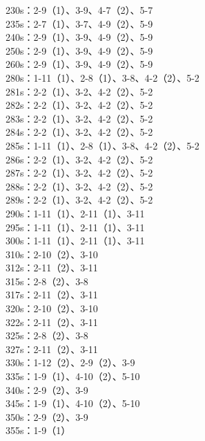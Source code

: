 \documentclass[a4paper,12pt]{article}
\begin{document}
		\indent 230s：2-9（1）、3-9、4-7（2）、5-7\\
		\indent 235s：2-7（1）、3-7、4-9（2）、5-9\\
		\indent 240s：2-9（1）、3-9、4-9（2）、5-9\\
		\indent 250s：2-9（1）、3-9、4-9（2）、5-9\\
		\indent 260s：2-9（1）、3-9、4-9（2）、5-9\\
		\indent 280s：1-11（1）、2-8（1）、3-8、4-2（2）、5-2\\
		\indent 281s：2-2（1）、3-2、4-2（2）、5-2\\
		\indent 282s：2-2（1）、3-2、4-2（2）、5-2\\
		\indent 283s：2-2（1）、3-2、4-2（2）、5-2\\
		\indent 284s：2-2（1）、3-2、4-2（2）、5-2\\
		\indent 285s：1-11（1）、2-8（1）、3-8、4-2（2）、5-2\\
		\indent 286s：2-2（1）、3-2、4-2（2）、5-2\\
		\indent 287s：2-2（1）、3-2、4-2（2）、5-2\\
		\indent 288s：2-2（1）、3-2、4-2（2）、5-2\\
		\indent 289s：2-2（1）、3-2、4-2（2）、5-2\\
		\indent 290s：1-11（1）、2-11（1）、3-11\\
		\indent 295s：1-11（1）、2-11（1）、3-11\\
		\indent 300s：1-11（1）、2-11（1）、3-11\\
		\indent 310s：2-10（2）、3-10\\
		\indent 312s：2-11（2）、3-11\\
		\indent 315s：2-8（2）、3-8\\
		\indent 317s：2-11（2）、3-11\\
		\indent 320s：2-10（2）、3-10\\
		\indent 322s：2-11（2）、3-11\\
		\indent 325s：2-8（2）、3-8\\
		\indent 327s：2-11（2）、3-11\\
		\indent 330s：1-12（2）、2-9（2）、3-9\\
		\indent 335s：1-9（1）、4-10（2）、5-10\\
		\indent 340s：2-9（2）、3-9\\
		\indent 345s：1-9（1）、4-10（2）、5-10\\
		\indent 350s：2-9（2）、3-9\\
		\indent 355s：1-9（1）\\
\end{document}
